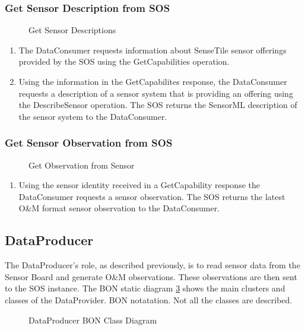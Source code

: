 \documentclass[]{final_report}
\begin{document}
\subsubsection{Get Sensor Description from SOS}
\begin{figure}[h]
\centering
{}
\caption{Get Sensor Descriptions}\label{fig:GetMeta}
\end{figure}
 \begin{enumerate}
\item The DataConsumer requests information about SenseTile sensor offerings provided by the SOS using the GetCapabilities operation.
\item Using the information in the GetCapabilites response, the DataConsumer requests a description of a sensor system that is providing an offering using the DescribeSensor operation. The SOS returns the SensorML description of the sensor system to the DataConsumer.
\end{enumerate}

\subsubsection{Get  Sensor Observation from SOS}
\begin{figure}[h]
\centering
{}
\caption{Get Observation from Sensor}\label{fig:GetObs}
\end{figure}
 \begin{enumerate}
\item Using the sensor identity received in a GetCapability response the DataConsumer requests a sensor observation. The SOS returns the latest O\&M format sensor observation to the DataConsumer.
\end{enumerate}


\newpage
\subsection{DataProducer}\label{DataProducerHigh}
The DataProducer's role, as described previously, is to read sensor data from the Sensor Board and generate O\&M observations. These observations are then sent to the SOS instance. The BON static diagram \ref{fig:bon_static_diagam_producer.png}
 shows the main clusters and classes of the DataProvider. BON notatation. Not all the classes are described.
\begin{figure}[h]
\centering
{}
\caption{DataProducer BON Class Diagram}\label{fig:bon_static_diagam_producer.png}
\end{figure}
\end{document}
